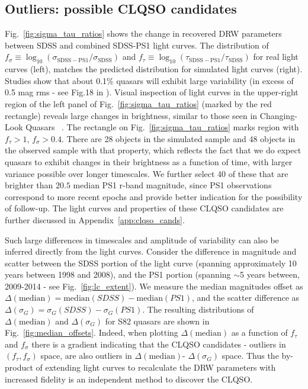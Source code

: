 \documentclass[twocolumn]{aastex62}
\begin{document}
\subsection{Outliers: possible CLQSO candidates}
\label{sec:outliers}
Fig.~\ref{fig:sigma_tau_ratios} shows the change in recovered DRW parameters between SDSS and combined SDSS-PS1 light curves. The distribution of $f_{\sigma} \equiv \log_{10}{(\sigma_{\mathrm{SDSS-PS1}} / \sigma_{\mathrm{SDSS}})}$ and $f_{\tau} \equiv \log_{10}{(\tau_{\mathrm{SDSS-PS1}} / \tau_{\mathrm{SDSS}} )}$ for real light curves (left), matches the predicted distribution for simulated light curves (right). Studies show that about 0.1\% quasars will exhibit large variability (in excess of 0.5 mag rms - see Fig.18 in \citealt{macleod2012}). Visual inspection of light curves in the upper-right region of the left panel of Fig.~\ref{fig:sigma_tau_ratios} (marked by the red rectangle) reveals large changes in brightness, similar to those seen in Changing-Look Quasars
~\citep{sheng2020, macleod2019, ruan2019, frederick2019,trakhtenbrot2019,shen2019,stern2018,ross2018,lawrence2018,yang2018,gezari2017, stern2017, sheng2017, blanchard2017, ruan2016, runnoe2016, guo2016, lamassa2015,schawinski2015, elitzur2014}. The rectangle on Fig.~\ref{fig:sigma_tau_ratios} marks region with  $f_{\tau} > 1$, $f_{\sigma} > 0.4$. There are 28 objects in the simulated sample and 48 objects in the observed sample with that property, which reflects the fact that we do expect quasars to exhibit changes in their brightness as a function of time, with larger variance possible over longer timescales. We further select 40 of these that are brighter than  $20.5$ median PS1 r-band magnitude, since PS1 observations correspond to more recent epochs and provide better indication for the possibility of follow-up. The light curves and properties of these CLQSO candidates are further discussed in Appendix~\ref{app:clqso_cands}.


Such large differences in timescales and amplitude of variability can also be inferred directly from the light curves. Consider the difference in magnitude and scatter between the SDSS portion of the light curve (spanning approximately 10 years between 1998 and 2008), and the PS1 portion (spanning $\sim$5 years between, 2009-2014 - see Fig.~\ref{fig:lc_extent}). We measure the median magnitudes offset as $\Delta(\mathrm{median}) =  \mathrm{median}(SDSS) - \mathrm{median}(PS1)$, and the scatter difference as $\Delta(\sigma_{G}) = \sigma_{G}(SDSS)-\sigma_{G}(PS1)$. The resulting distributions of  $\Delta(\mathrm{median}) $ and $\Delta(\sigma_{G})$ for S82 quasars are shown in Fig.~\ref{fig:median_offsets}. Indeed, when plotting $\Delta(\mathrm{median})$ as a function of $f_{\tau}$ and $f_{\sigma}$ there is a gradient indicating that the  CLQSO candidates - outliers in $(f_{\tau}, f_{\sigma})$ space, are also outliers in $\Delta(\mathrm{median})$- $\Delta(\sigma_{G})$ space. Thus the by-product of extending light curves to recalculate the DRW parameters with increased fidelity is an independent method to discover the CLQSO. 
\end{document}
